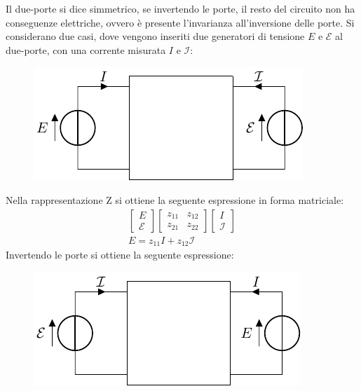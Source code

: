 \documentclass{article}
\numberwithin{equation}{subsection}
\begin{document}
Il due-porte si dice simmetrico, se invertendo le porte, il resto del circuito non ha conseguenze elettriche, ovvero è presente l'invarianza all'inversione delle porte. 
Si considerano due casi, dove vengono inseriti due generatori di tensione $E$ e $\mathcal{E}$ al due-porte, con una corrente misurata $I$ e $\mathcal{I}$:
\begin{figure}[H]%
    \centering
    \includegraphics{due-porte-entrate.pdf}%
    \label{fig:due-porte-forzanti}
\end{figure}

Nella rappresentazione Z si ottiene la seguente espressione in forma matriciale:
\begin{gather*}
    \begin{bmatrix}
        E\\\mathcal{E}
    \end{bmatrix}\begin{bmatrix}
        z_{11}&z_{12}\\z_{21}&z_{22}
    \end{bmatrix}\begin{bmatrix}
        I\\\mathcal{I}
    \end{bmatrix}\\
    E=z_{11}I+z_{12}\mathcal{I}
\end{gather*}
Invertendo le porte si ottiene la seguente espressione:
\begin{figure}[H]%
    \centering
    \includegraphics{due-porte-entrate-invertite.pdf}%
    \label{fig:due-porte-forzanti-invertite}
\end{figure}
\end{document}
